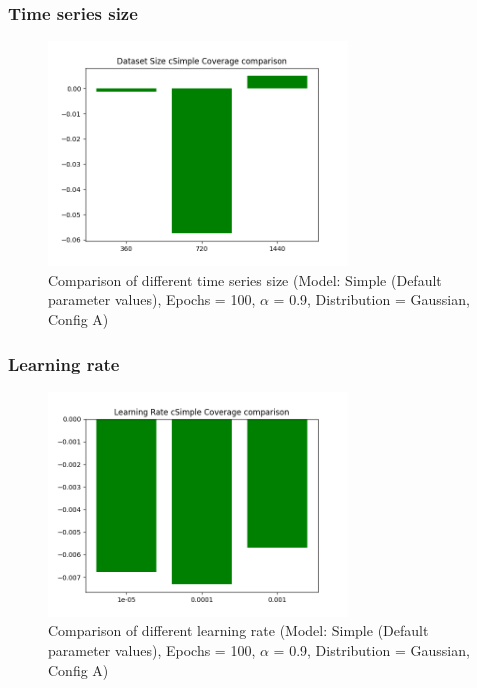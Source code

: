 \subsubsection{Time series size} \label{comp_lr}

\begin{figure}[H]
    \centering
    \includegraphics[width=300px]{plots/hist/a/datasize/cSimple/Coverage.png}
    \caption{Comparison of different time series size (Model: Simple (Default parameter values), Epochs = 100, $\alpha$ = 0.9, Distribution = Gaussian, Config A)}
    \label{fig:comp_datasize}
\end{figure}


\subsubsection{Learning rate} \label{comp_lr}

\begin{figure}[H]
    \centering
    \includegraphics[width=300px]{plots/hist/a/lr/cSimple/Coverage.png}
    \caption{Comparison of different learning rate (Model: Simple (Default parameter values), Epochs = 100, $\alpha$ = 0.9, Distribution = Gaussian, Config A)}
    \label{fig:comp_lr}
\end{figure}


